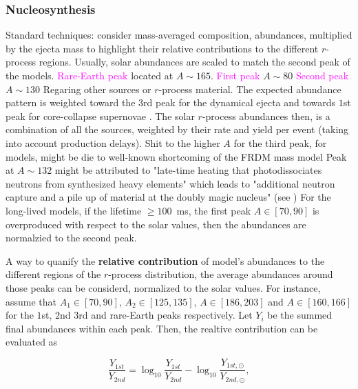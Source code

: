\documentclass[11pt,a4paper,headinclude=true,DIV=14,BCOR=8mm,chapterprefix,listof=totoc,twoside,openright,abstracton]{scrbook}
\newcommand{\magenta}[1]{\textcolor{magenta}{#1}} %
\begin{document}

\subsubsection{Nucleosynthesis}

Standard techniques: consider mass-averaged composition, abundances, multiplied by the ejecta mass to highlight their relative contributions to the different $r$-process regions. 
Usually, solar abundances are scaled to match the second peak of the models.
\magenta{Rare-Earth peak} located at $A\sim165$.
\magenta{First peak} $A\sim80$
\magenta{Second peak} $A\sim130$
Regaring other sources or $r$-process material. The expected abundance pattern is weighted toward the $3$rd peak for the dynamical ejecta \cite{(e.g., Goriely et al., 2011;  Wanajo et al., 2014; Roberts et al., 2017)} and towards $1$st peak for core-collapse supernovae \cite{(e.g., Wanajo, 2013; Shibagaki et al., 2016; Vlasov et al., 2017)}. The solar $r$-process abundances then, is a combination of all the sources, weighted by their rate and yield per event (taking into account production delays).
Shit to the higher $A$ for the third peak, for models, might be die to well-known shortcoming of the FRDM mass model \cite{(e.g., Mendoza-Temis et al.,2015; Mumpower et al., 2016)}
Peak at $A\sim132$ might be attributed to "late-time heating that photodissociates neutrons from synthesized heavy elements" which leads to "additional neutron capture and a pile up of material at the doubly magic nucleus" (see \cite{e.g., Wu et al. (2016) })
For the long-lived models, if the lifetime $\geq 100$~ms, the first peak $A\in[70,90]$ is overproduced with respect to the solar values, then the abundances are normalzied to the second peak. 

A way to quanify the \textbf{relative contribution} of model's abundances to the different regions of the $r$-process distribution, the average abundances around those peaks can be considerd, normalized to the solar values. 
For instance, assume that $A_1 \in [70,90]$, $A_2 \in [125,135]$, $A\in[186,203]$ and $A\in[160,166]$ for the $1$st, $2$nd $3$rd and rare-Earth peaks respectively. Let $Y_{i}$ be the summed final abundances within each peak. Then, the realtive contribution can be evaluated as 

\begin{equation}
    \frac{Y_{1st}}{Y_{2nd}} = \log_{10}\frac{Y_{1st}}{Y_{2nd}} - \log_{10}\frac{Y_{1st,\odot}}{Y_{2nd,\odot}},
\end{equation}
\end{document}
